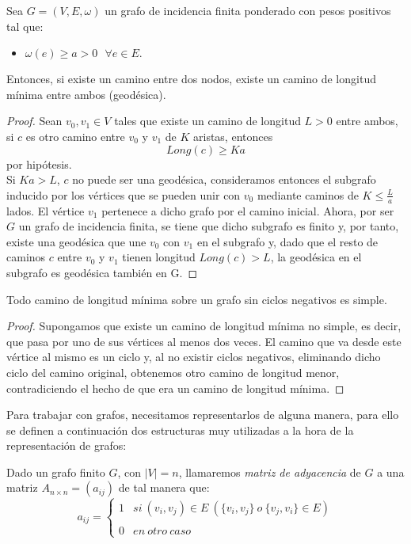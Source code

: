 \begin{proposicion}
	Sea $G=(V,E,\omega)$ un grafo de incidencia finita ponderado con pesos positivos tal que:
	\begin{itemize}
		\item $\omega (e)\geq a>0\ \ \ \forall e\in E.$
	\end{itemize}
	Entonces, si existe un camino entre dos nodos, existe un camino de longitud mínima entre ambos (geodésica).
\end{proposicion}

\begin{proof}
	Sean $v_0,v_1\in V$ tales que existe un camino de longitud $L>0$ entre ambos, si $c$ es otro camino entre $v_0$ y $v_1$ de $K$ aristas, entonces
	$$Long(c) \geq Ka$$
	por hipótesis.\\
	Si $Ka>L$, $c$ no puede ser una geodésica, consideramos entonces el subgrafo inducido por los vértices que se pueden unir con $v_0$ mediante caminos de $K\leq \frac{L}{a}$ lados. El vértice $v_1$ pertenece a dicho grafo por el camino inicial. Ahora, por ser $G$ un grafo de incidencia finita, se tiene que dicho subgrafo es finito y, por tanto, existe una geodésica que une $v_0$ con $v_1$ en el subgrafo y, dado que el resto de caminos $c$ entre $v_0$ y $v_1$ tienen longitud $Long(c) > L$, la geodésica en el subgrafo es geodésica también en G.
\end{proof}

\begin{proposicion}
	Todo camino de longitud mínima sobre un grafo sin ciclos negativos es simple.
\end{proposicion}

\begin{proof}
	Supongamos que existe un camino de longitud mínima no simple, es decir, que pasa por uno de sus vértices al menos dos veces. El camino que va desde este vértice al mismo es un ciclo y, al no existir ciclos negativos, eliminando dicho ciclo del camino original, obtenemos otro camino de longitud menor, contradiciendo el hecho de que era un camino de longitud mínima.
\end{proof}

Para trabajar con grafos, necesitamos representarlos de alguna manera, para ello se definen a continuación dos estructuras muy utilizadas a la hora de la representación de grafos:

\begin{definicion}
	Dado un grafo finito $G$, con $|V|=n$, llamaremos \textit{matriz de adyacencia} de $G$ a una matriz $A_{n\times n}=(a_{ij})$ de tal manera que:
	$$a_{ij}= \left\{ \begin{array}{lcc}
		1 &   si\ (v_i,v_j)\in E\ (\{v_i,v_j\}\ o\ \{v_j,v_i\}\in E) \\
		\\ 0 &  en\ otro\ caso
	\end{array}
	\right.$$
\end{definicion}

